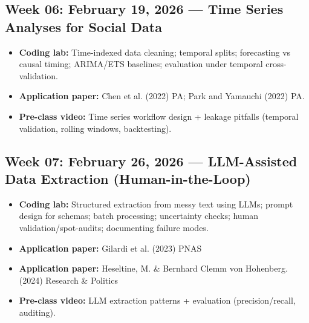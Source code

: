 \documentclass[letterpaper,11pt]{article}
\newcommand{\compresslist}{
\setlength{\itemsep}{1pt}
\setlength{\parskip}{0pt}
\setlength{\parsep}{0pt}
}
\begin{document}
\subsection*{Week 06: February 19, 2026 --- Time Series Analyses for Social Data}
\begin{itemize}\compresslist
\item \textbf{Coding lab:} Time-indexed data cleaning; temporal splits; forecasting vs causal timing; ARIMA/ETS baselines; evaluation under temporal cross-validation.
\item \textbf{Application paper:} Chen et al. (2022) PA; Park and Yamauchi (2022) PA.
\item \textbf{Pre-class video:} Time series workflow design + leakage pitfalls (temporal validation, rolling windows, backtesting).
\end{itemize}

\subsection*{Week 07: February 26, 2026 --- LLM-Assisted Data Extraction (Human-in-the-Loop)}
\begin{itemize}\compresslist
\item \textbf{Coding lab:} Structured extraction from messy text using LLMs; prompt design for schemas; batch processing; uncertainty checks; human validation/spot-audits; documenting failure modes.
\item \textbf{Application paper:} Gilardi et al. (2023) PNAS
\item \textbf{Application paper:} Heseltine, M. \& Bernhard Clemm von Hohenberg. (2024) Research \& Politics
\item \textbf{Pre-class video:} LLM extraction patterns + evaluation (precision/recall, auditing).
\end{itemize}
\end{document}
